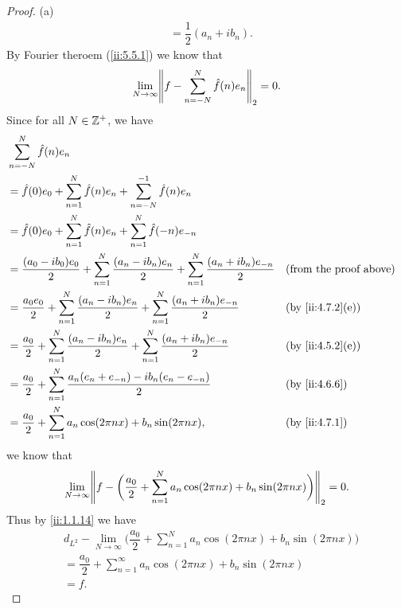 \begin{proof}{(a)}
\begin{align*}
     & = \dfrac{1}{2} (a_n + i b_n).
  \end{align*}
  By Fourier theroem (\cref{ii:5.5.1}) we know that
  \[
    \lim_{N \to \infty} \norm*{f - \sum_{n = -N}^N \hat{f}(n) e_n}_2 = 0.
  \]
  Since for all \(N \in \mathbb{Z}^+\), we have
  \begin{align*}
     & \sum_{n = -N}^N \hat{f}(n) e_n                                                                                                                                   \\
     & = \hat{f}(0) e_0 + \sum_{n = 1}^N \hat{f}(n) e_n + \sum_{n = -N}^{-1} \hat{f}(n) e_n                                                                             \\
     & = \hat{f}(0) e_0 + \sum_{n = 1}^N \hat{f}(n) e_n + \sum_{n = 1}^N \hat{f}(-n) e_{-n}                                                                             \\
     & = \dfrac{(a_0 - i b_0) e_0}{2} + \sum_{n = 1}^N \dfrac{(a_n - i b_n) e_n}{2} + \sum_{n = 1}^N \dfrac{(a_n + i b_n) e_{-n}}{2} &  & \text{(from the proof above)} \\
     & = \dfrac{a_0 e_0}{2} + \sum_{n = 1}^N \dfrac{(a_n - i b_n) e_n}{2} + \sum_{n = 1}^N \dfrac{(a_n + i b_n) e_{-n}}{2}           &  & \by{ii:4.7.2}[e]              \\
     & = \dfrac{a_0}{2} + \sum_{n = 1}^N \dfrac{(a_n - i b_n) e_n}{2} + \sum_{n = 1}^N \dfrac{(a_n + i b_n) e_{-n}}{2}               &  & \by{ii:4.5.2}[e]              \\
     & = \dfrac{a_0}{2} + \sum_{n = 1}^N \dfrac{a_n (e_n + e_{-n}) - i b_n (e_n - e_{-n})}{2}                                        &  & \by{ii:4.6.6}                 \\
     & = \dfrac{a_0}{2} + \sum_{n = 1}^N a_n \cos(2 \pi n x) + b_n \sin(2 \pi n x),                                                  &  & \by{ii:4.7.1}
  \end{align*}
  we know that
  \[
    \lim_{N \to \infty} \norm*{f - \bigg(\dfrac{a_0}{2} + \sum_{n = 1}^N a_n \cos(2 \pi n x) + b_n \sin(2 \pi n x)\bigg)}_2 = 0.
  \]
  Thus by \cref{ii:1.1.14} we have
  \begin{align*}
     & d_{L^2} - \lim_{N \to \infty} \bigg(\dfrac{a_0}{2} + \sum_{n = 1}^N a_n \cos(2 \pi n x) + b_n \sin(2 \pi n x)\bigg) \\
     & = \dfrac{a_0}{2} + \sum_{n = 1}^\infty a_n \cos(2 \pi n x) + b_n \sin(2 \pi n x)                                    \\
     & = f.
  \end{align*}
\end{proof}

